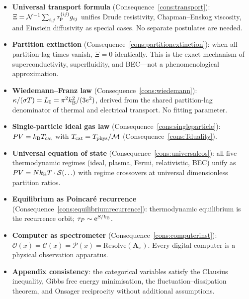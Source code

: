 \bigskip
\begin{tcolorbox}[colback=crowngold!8, colframe=crowngold!70!black,
                  title={\textbf{Chapter 17 Summary}}]
\begin{itemize}[noitemsep]
  \item \textbf{Universal transport formula}
        (Consequence~\ref{cons:transport}):
        $\Xi = \mathcal{N}^{-1}\sum_{i,j}\tau_{\mathrm{p}}^{(ij)} g_{ij}$ unifies
        Drude resistivity, Chapman--Enskog viscosity, and Einstein
        diffusivity as special cases.  No separate postulates are needed.

  \item \textbf{Partition extinction}
        (Consequence~\ref{cons:partitionextinction}):
        when all partition-lag times vanish, $\Xi = 0$ identically.
        This is the exact mechanism of superconductivity, superfluidity,
        and BEC---not a phenomenological approximation.

  \item \textbf{Wiedemann--Franz law}
        (Consequence~\ref{cons:wiedemann}):
        $\kappa/(\sigma T) = L_0 = \pi^2k_{\mathrm{B}}^2/(3e^2)$, derived from the
        shared partition-lag denominator of thermal and electrical
        transport.  No fitting parameter.

  \item \textbf{Single-particle ideal gas law}
        (Consequence~\ref{cons:singleparticle}):
        $PV = k_{\mathrm{B}} T_{\mathrm{cat}}$ with
        $T_{\mathrm{cat}} = T_{\mathrm{phys}}/\mathcal{M}$
        (Consequence~\ref{cons:Tduality}).

  \item \textbf{Universal equation of state}
        (Consequence~\ref{cons:universaleos}):
        all five thermodynamic regimes (ideal, plasma, Fermi, relativistic,
        BEC) unify as $PV = Nk_{\mathrm{B}} T \cdot \mathcal{S}(\ldots)$ with regime
        crossovers at universal dimensionless partition ratios.

  \item \textbf{Equilibrium as Poincar\'e recurrence}
        (Consequence~\ref{cons:equilibriumrecurrence}):
        thermodynamic equilibrium is the recurrence orbit; $\tau_P \sim
        \mathrm{e}^{S/k_{\mathrm{B}}}$.

  \item \textbf{Computer as spectrometer}
        (Consequence~\ref{cons:computerinst}):
        $\mathcal{O}(x) = \mathcal{C}(x) = \mathcal{P}(x) =
        \mathrm{Resolve}(\mathbf{A}_x)$.  Every digital computer is a
        physical observation apparatus.

  \item \textbf{Appendix consistency}: the categorical variables satisfy
        the Clausius inequality, Gibbs free energy minimisation, the
        fluctuation--dissipation theorem, and Onsager reciprocity without
        additional assumptions.
\end{itemize}
\end{tcolorbox}
